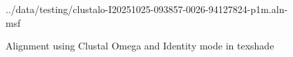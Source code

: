 \documentclass{article}
\begin{document}
\begin{figure}[htbp]
\begin{texshade}{../data/testing/clustalo-I20251025-093857-0026-94127824-p1m.aln-msf}
\showlegend
\end{texshade}
\caption{Alignment using Clustal Omega and Identity mode in texshade}
\label{fig:workflow}
\end{figure}
\end{document}
